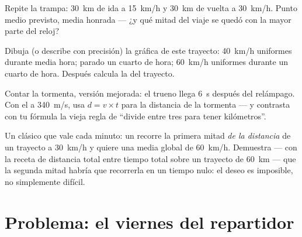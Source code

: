 \begin{exercise}[$\star\star$]\label{exo:g7:motion-average-speed:9}
Repite la trampa: \qty{30}{km} de ida a \qty{15}{km/h} y \qty{30}{km}
de vuelta a \qty{30}{km/h}. Punto medio previsto, media honrada ---
¿y qué mitad del viaje se quedó con la mayor parte del reloj?
\end{exercise}

\begin{exercise}[$\star\star$]\label{exo:g7:motion-average-speed:10}
Dibuja (o describe con precisión) la gráfica de este trayecto:
\qty{40}{km/h} uniformes durante media hora; parado un cuarto de hora;
\qty{60}{km/h} uniformes durante un cuarto de hora. Después calcula la
 del trayecto.
\end{exercise}

\begin{exercise}[$\star\star$]\label{exo:g7:motion-average-speed:11}
Contar la tormenta, versión mejorada: el trueno llega \qty{6}{s}
después del relámpago. Con el  a \qty{340}{m/s}, usa $d = v
\times t$ para la distancia de la tormenta --- y contrasta con tu
fórmula la vieja regla de ``divide entre tres para tener
kilómetros''.
\end{exercise}

\begin{exercise}[$\star\star\star$]\label{exo:g7:motion-average-speed:12}
Un clásico que vale cada minuto: un  recorre la primera mitad
\emph{de la distancia} de un trayecto a \qty{30}{km/h} y quiere una
media global de \qty{60}{km/h}. Demuestra --- con la receta de
distancia total entre tiempo total sobre un trayecto de \qty{60}{km}
--- que la segunda mitad habría que recorrerla en un tiempo nulo: el
deseo es imposible, no simplemente difícil.
\end{exercise}

\section{Problema: el viernes del repartidor}

